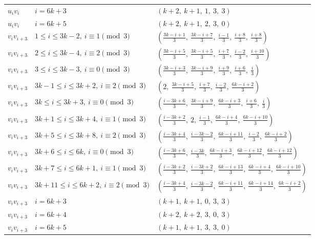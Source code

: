\begin{longtable}{lll}
$u_i v_i$ & $i = 6k+3$ & $(k+2,\ k+1,\ 1,\ 3,\ 3)$ \\
$u_i v_i$ & $i = 6k+5$ & $(k+2,\ k+1,\ 2,\ 3,\ 0)$ \\
$v_i v_{i+3}$ & $1 \le i \le 3k-2,\ i \equiv 1 \pmod{3}$ & $(\frac{3k-i+1}{3},\ \frac{3k-i+7}{3},\ \frac{i-1}{3},\ \frac{i+8}{3},\ \frac{i+8}{3})$ \\
$v_i v_{i+3}$ & $2 \le i \le 3k-4,\ i \equiv 2 \pmod{3}$ & $(\frac{3k-i+5}{3},\ \frac{3k-i+5}{3},\ \frac{i+7}{3},\ \frac{i-2}{3},\ \frac{i+10}{3})$ \\
$v_i v_{i+3}$ & $3 \le i \le 3k-3,\ i \equiv 0 \pmod{3}$ & $(\frac{3k-i+3}{3},\ \frac{3k-i+9}{3},\ \frac{i+9}{3},\ \frac{i+6}{3},\ \frac{i}{3})$ \\
$v_i v_{i+3}$ & $3k-1 \le i \le 3k+2,\ i \equiv 2 \pmod{3}$ & $(2,\ \frac{3k-i+5}{3},\ \frac{i+7}{3},\ \frac{i-2}{3},\ \frac{6k-i+2}{3})$ \\
$v_i v_{i+3}$ & $3k \le i \le 3k+3,\ i \equiv 0 \pmod{3}$ & $(\frac{i-3k+6}{3},\ \frac{3k-i+9}{3},\ \frac{6k-i+3}{3},\ \frac{i+6}{3},\ \frac{i}{3})$ \\
$v_i v_{i+3}$ & $3k+1 \le i \le 3k+4,\ i \equiv 1 \pmod{3}$ & $(\frac{i-3k+2}{3},\ 2,\ \frac{i-1}{3},\ \frac{6k-i+4}{3},\ \frac{6k-i+10}{3})$ \\
$v_i v_{i+3}$ & $3k+5 \le i \le 3k+8,\ i \equiv 2 \pmod{3}$ & $(\frac{i-3k+4}{3},\ \frac{i-3k-2}{3},\ \frac{6k-i+11}{3},\ \frac{i-2}{3},\ \frac{6k-i+2}{3})$ \\
$v_i v_{i+3}$ & $3k+6 \le i \le 6k,\ i \equiv 0 \pmod{3}$ & $(\frac{i-3k+6}{3},\ \frac{i-3k}{3},\ \frac{6k-i+3}{3},\ \frac{6k-i+12}{3},\ \frac{6k-i+12}{3})$ \\
$v_i v_{i+3}$ & $3k+7 \le i \le 6k+1,\ i \equiv 1 \pmod{3}$ & $(\frac{i-3k+2}{3},\ \frac{i-3k+2}{3},\ \frac{6k-i+13}{3},\ \frac{6k-i+4}{3},\ \frac{6k-i+10}{3})$ \\
$v_i v_{i+3}$ & $3k+11 \le i \le 6k+2,\ i \equiv 2 \pmod{3}$ & $(\frac{i-3k+4}{3},\ \frac{i-3k-2}{3},\ \frac{6k-i+11}{3},\ \frac{6k-i+14}{3},\ \frac{6k-i+2}{3})$ \\
$v_i v_{i+3}$ & $i = 6k+3$ & $(k+1,\ k+1,\ 0,\ 3,\ 3)$ \\
$v_i v_{i+3}$ & $i = 6k+4$ & $(k+2,\ k+2,\ 3,\ 0,\ 3)$ \\
$v_i v_{i+3}$ & $i = 6k+5$ & $(k+1,\ k+1,\ 3,\ 3,\ 0)$ \\
\hline
\end{longtable}

